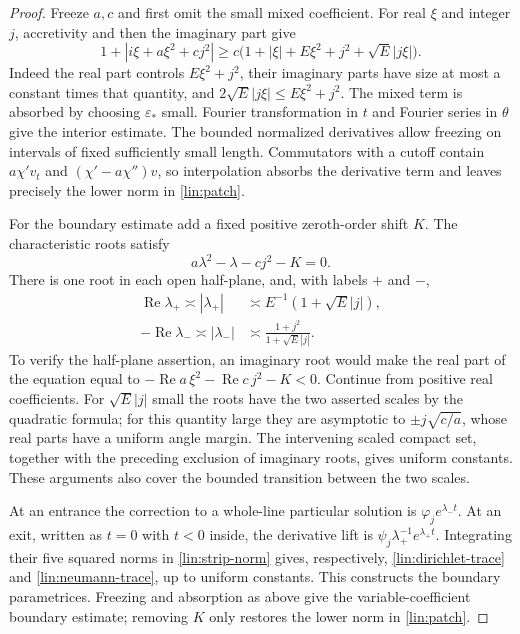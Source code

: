 \begin{proof}
Freeze $a,c$ and first omit the small mixed coefficient.  For real
$\xi$ and integer $j$, accretivity and then the imaginary part give
\begin{equation}\label{lin:symbol}
 1+|i\xi+a\xi^2+cj^2|
 \ge c\bigl(1+|\xi|+E\xi^2+j^2+\sqrt E|j\xi|\bigr).
\end{equation}
Indeed the real part controls $E\xi^2+j^2$, their imaginary parts have
size at most a constant times that quantity, and
$2\sqrt E|j\xi|\le E\xi^2+j^2$.  The mixed term is absorbed by choosing
$\varepsilon_*$ small.  Fourier transformation in $t$ and Fourier
series in $\theta$ give the interior estimate.  The bounded normalized
derivatives allow freezing on intervals of fixed sufficiently small
length.  Commutators with a cutoff contain $a\chi'v_t$ and
$(\chi'-a\chi'')v$, so interpolation absorbs the derivative term and
leaves precisely the lower norm in \eqref{lin:patch}.

For the boundary estimate add a fixed positive zeroth-order shift
$K$.  The characteristic roots satisfy
\[
 a\lambda^2-\lambda-cj^2-K=0.
\]
There is one root in each open half-plane, and, with labels $+$ and $-$,
\begin{equation}\label{lin:roots}
 \begin{split}
 \operatorname{Re}\lambda_+\asymp|\lambda_+|
     &\asymp E^{-1}(1+\sqrt E|j|),\\
 -\operatorname{Re}\lambda_-\asymp|\lambda_-|
     &\asymp\frac{1+j^2}{1+\sqrt E|j|}.
 \end{split}
\end{equation}
To verify the half-plane assertion, an imaginary root would make the
real part of the equation equal to
$-\operatorname{Re}a\,\xi^2-\operatorname{Re}c\,j^2-K<0$.
Continue from positive real coefficients.  For $\sqrt E|j|$ small the
roots have the two asserted scales by the quadratic formula; for this
quantity large they are asymptotic to
$\pm j\sqrt{c/a}$, whose real parts have a uniform angle margin.
The intervening scaled compact set, together with the preceding
exclusion of imaginary roots, gives uniform constants.  These arguments
also cover the bounded transition between the two scales.

At an entrance the correction to a whole-line particular solution is
$\varphi_j e^{\lambda_-t}$.  At an exit, written as $t=0$ with $t<0$
inside, the derivative lift is
$\psi_j\lambda_+^{-1}e^{\lambda_+t}$.  Integrating their five squared
norms in \eqref{lin:strip-norm} gives, respectively,
\eqref{lin:dirichlet-trace} and \eqref{lin:neumann-trace}, up to uniform
constants.  This constructs the boundary parametrices.  Freezing and
absorption as above give the variable-coefficient boundary estimate;
removing $K$ only restores the lower norm in \eqref{lin:patch}.


\end{proof}
